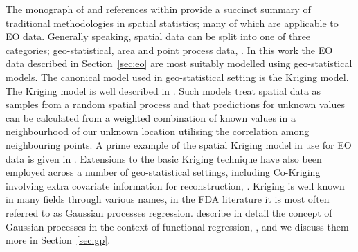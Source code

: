 The monograph of \cite{cressie_statistics_2010} and references within provide a succinct summary of traditional methodologies in spatial statistics; many of which are applicable to EO data.
Generally speaking, spatial data can be split into one of three categories; geo-statistical, area and point process data, \citep{cressie_statistics_2010}.
In this work the EO data described in Section~\ref{sec:eo}  are most suitably modelled using geo-statistical models.
The canonical model used in geo-statistical setting is the Kriging model.
The Kriging model is well described in \cite{stein_interpolation_1999}.
Such models treat spatial data as samples from a random spatial process and that predictions for unknown values can be calculated from a weighted combination of known values in a neighbourhood of our unknown location utilising the correlation among neighbouring points.
A prime example of the spatial Kriging model in use for EO data is given in \cite{rossi_kriging_1994}.
Extensions to the basic Kriging technique have also been employed across a number of geo-statistical settings, including Co-Kriging involving extra covariate information for reconstruction, \cite{zhang_restoration_2009}.
Kriging is well known in many fields through various names, in the FDA literature it is most often referred to as Gaussian processes regression.
\citeauthor{shi_gaussian_2011} describe in detail the concept of Gaussian processes in the context of functional regression, \citep{shi_gaussian_2011}, and we discuss them more in Section~\ref{sec:gp}. 

